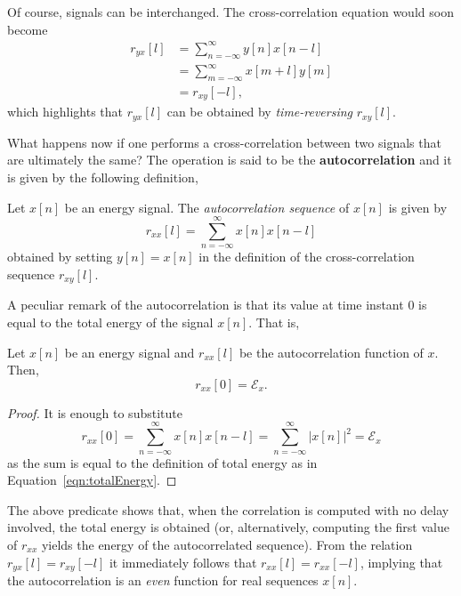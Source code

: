 \documentclass[\documentfontsize, twocolumn]{\classname}
\begin{document}
Of course, signals can be interchanged. The cross-correlation equation would soon become
\begin{align*}
    r_{yx}[l] &= \sum_{n=-\infty}^\infty y[n]x[n-l]\\
              &= \sum_{m=-\infty}^\infty x[m+l]y[m]\\
              &= r_{xy}[-l],
\end{align*}
which highlights that $r_{yx}[l]$ can be obtained by \emph{time-reversing} $r_{xy}[l]$.

What happens now if one performs a cross-correlation between two signals that are ultimately the same? The operation is said to be the \textbf{autocorrelation} and it is given by the following definition,
\begin{defin}[Autocorrelation]
    Let $x[n]$ be an energy signal. The \emph{autocorrelation sequence} of $x[n]$ is given by
    \begin{equation}\label{eqn:autocorrelation}
        r_{xx}[l] = \sum_{n=-\infty}^\infty x[n]x[n-l]
    \end{equation}
    obtained by setting $y[n]=x[n]$ in the definition of the cross-correlation sequence $r_{xy}[l]$.
\end{defin}

A peculiar remark of the autocorrelation is that its value at time instant $0$ is equal to the total energy of the signal $x[n]$. That is,

\begin{predicate}
    Let $x[n]$ be an energy signal and $r_{xx}[l]$ be the autocorrelation function of $x$. Then,
    \begin{equation}\label{eqn:equivalenceAutocorrelationEnergy}
        r_{xx}[0] = \mathcal E_x.
    \end{equation}
\end{predicate}

\begin{proof}
    It is enough to substitute
    \[
        r_{xx}[0] = \sum_{n=-\infty}^\infty x[n]x[n-l] =\sum_{n=-\infty}^\infty |x[n]|^2 = \mathcal E_x
    \]
    as the sum is equal to the definition of total energy as in Equation~\ref{eqn:totalEnergy}.
\end{proof}

The above predicate shows that, when the correlation is computed with no delay
involved, the total energy is obtained (or, alternatively, computing the first
value of $r_{xx}$ yields the energy of the autocorrelated sequence). From the
relation $r_{yx}[l] = r_{xy}[-l]$ it immediately follows that $r_{xx}[l] =
r_{xx}[-l]$, implying that the autocorrelation is an \emph{even} function for
real sequences $x[n]$.
\end{document}

